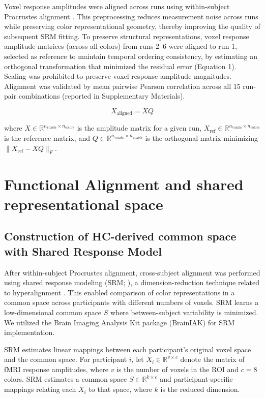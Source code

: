 Voxel response amplitudes were aligned across runs using within-subject Procrustes alignment \cite{gower1975}. This preprocessing reduces measurement noise across runs while preserving color representational geometry, thereby improving the quality of subsequent SRM fitting. To preserve structural representations, voxel response amplitude matrices (across all colors) from runs 2--6 were aligned to run 1, selected as reference to maintain temporal ordering consistency, by estimating an orthogonal transformation that minimized the residual error (Equation 1). Scaling was prohibited to preserve voxel response amplitude magnitudes. Alignment was validated by mean pairwise Pearson correlation across all 15 run-pair combinations (reported in Supplementary Materials).

\begin{equation}
X_{\text{aligned}} = XQ
\end{equation}

where $X \in \mathbb{R}^{n_{\text{voxels}} \times n_{\text{colors}}}$ is the amplitude matrix for a given run, $X_{\text{ref}} \in \mathbb{R}^{n_{\text{voxels}} \times n_{\text{colors}}}$ is the reference matrix, and $Q \in \mathbb{R}^{n_{\text{voxels}} \times n_{\text{voxels}}}$ is the orthogonal matrix minimizing $\|X_{\text{ref}} - XQ\|_F$.

\section{Functional Alignment and shared representational space}

\subsection*{Construction of HC-derived common space with Shared Response Model}

After within-subject Procrustes alignment, cross-subject alignment was performed using shared response modeling (SRM; ), a dimension-reduction technique related to hyperalignment \cite{haxby2011, guntupalli2016}. This enabled comparison of color representations in a common space across participants with different numbers of voxels. SRM learns a low-dimensional common space $S$ where between-subject variability is minimized. We utilized the Brain Imaging Analysis Kit package (BrainIAK) for SRM implementation.

SRM estimates linear mappings between each participant's original voxel space and the common space. For participant $i$, let $X_i \in \mathbb{R}^{v \times c}$ denote the matrix of fMRI response amplitudes, where $v$ is the number of voxels in the ROI and $c = 8$ colors. SRM estimates a common space $S \in \mathbb{R}^{k \times c}$ and participant-specific mappings relating each $X_i$ to that space, where $k$ is the reduced dimension.

